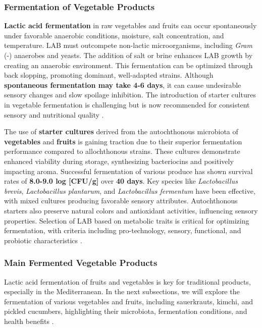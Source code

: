 \subsubsection{Fermentation of Vegetable Products}
\textbf{Lactic acid fermentation} in raw vegetables and fruits can occur spontaneously under favorable anaerobic conditions, moisture, salt concentration, and temperature. LAB must outcompete non-lactic microorganisms, including \textit{Gram} (-) anaerobes and yeasts. The addition of salt or brine enhances LAB growth by creating an anaerobic environment. This fermentation can be optimized through back slopping, promoting dominant, well-adapted strains. Although \textbf{spontaneous fermentation may take 4-6 days}, it can cause undesirable sensory changes and slow spoilage inhibition. The introduction of starter cultures in vegetable fermentation is challenging but is now recommended for consistent sensory and nutritional quality \cite*{L8-VegFruit}.

The use of \textbf{starter cultures} derived from the autochthonous microbiota of \textbf{vegetables} and \textbf{fruits} is gaining traction due to their superior fermentation performance compared to allochthonous strains. These cultures demonstrate enhanced viability during storage, synthesizing bacteriocins and positively impacting aroma. Successful fermentation of various produce has shown survival rates of \textbf{8.0-9.0 log [CFU/g]} over \textbf{40 days}. Key species like \textit{Lactobacillus brevis}, \textit{Lactobacillus plantarum}, and \textit{Lactobacillus fermentum} have been effective, with mixed cultures producing favorable sensory attributes. Autochthonous starters also preserve natural colors and antioxidant activities, influencing sensory properties. Selection of LAB based on metabolic traits is critical for optimizing fermentation, with criteria including pro-technology, sensory, functional, and probiotic characteristics \cite*{L8-VegFruit}. 

\subsubsection{Main Fermented Vegetable Products}
Lactic acid fermentation of fruits and vegetables is key for traditional products, especially in the Mediterranean. In the next subsections, we will explore the fermentation of various vegetables and fruits, including sauerkrauts, kimchi, and pickled cucumbers, highlighting their microbiota, fermentation conditions, and health benefits \cite*{L8-VegFruit}.

